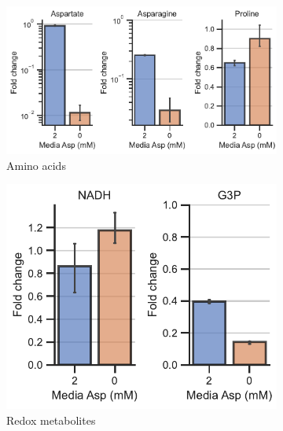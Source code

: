 \begin{figure}[!ht]
     \centering
     \begin{subfigure}[b]{0.45\textwidth}
         \includegraphics[width=\textwidth]{figures/sapp/GOT_DKO_Asp_depl/143B_DKO_AA.pdf}
         \caption{Amino acids}
         \label{fig:sapp:GOT_DKO_Asp_depl:143B_DKO_AA}
     \end{subfigure}
     \hspace{0.1\textwidth}
     \begin{subfigure}[b]{0.3\textwidth}
         \includegraphics[width=\textwidth]{figures/sapp/GOT_DKO_Asp_depl/143B_DKO_rd.pdf}
         \caption{Redox metabolites}
         \label{fig:sapp:GOT_DKO_Asp_depl:143B_DKO_rd}
     \end{subfigure}
     \hfill
     \begin{subfigure}[b]{0.6\textwidth}

\end{subfigure}
\end{figure}
